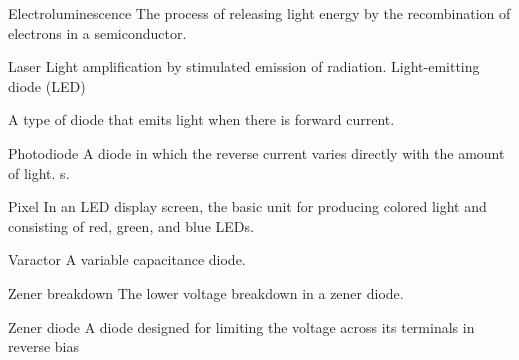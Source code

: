 Electroluminescence The process of releasing light energy by the recombination of electrons in a
semiconductor.

Laser Light amplification by stimulated emission of radiation.
Light-emitting diode (LED)

A type of diode that emits light when there is forward current.


Photodiode A diode in which the reverse current varies directly with the amount of light.
s.

Pixel In an LED display screen, the basic unit for producing colored light and consisting of red,
green, and blue LEDs.


Varactor A variable capacitance diode.


Zener breakdown The lower voltage breakdown in a zener diode.


Zener diode A diode designed for limiting the voltage across its terminals in reverse bias